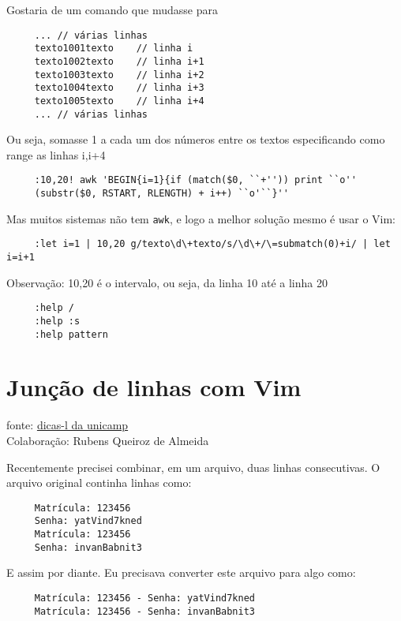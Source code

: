 Gostaria de um comando que mudasse para

\begin{verbatim}
     ... // várias linhas
     texto1001texto    // linha i
     texto1002texto    // linha i+1
     texto1003texto    // linha i+2
     texto1004texto    // linha i+3
     texto1005texto    // linha i+4
     ... // várias linhas
\end{verbatim}

Ou seja, somasse 1 a cada um dos números entre os textos
especificando como range as linhas i,i+4

\begin{verbatim}
     :10,20! awk 'BEGIN{i=1}{if (match($0, ``+'')) print ``o''
     (substr($0, RSTART, RLENGTH) + i++) ``o'``}''
\end{verbatim}

Mas muitos sistemas não tem {\tt awk}, e logo a melhor solução mesmo é usar o Vim:

\begin{verbatim}
     :let i=1 | 10,20 g/texto\d\+texto/s/\d\+/\=submatch(0)+i/ | let i=i+1
\end{verbatim}

Observação: 10,20 é o intervalo, ou seja, da linha 10 até a linha 20

\begin{verbatim}
     :help /
     :help :s
     :help pattern
\end{verbatim}



\section{Junção de linhas com Vim}
\label{sec:Junção de linhas com Vim}
fonte: \href{http://www.dicas-l.com.br/dicas-l/20081228.php}{dicas-l da unicamp} \\ 
Colaboração: Rubens Queiroz de Almeida

Recentemente precisei combinar, em um arquivo, duas linhas
consecutivas. O arquivo original continha linhas como:

\begin{verbatim}
     Matrícula: 123456
     Senha: yatVind7kned
     Matrícula: 123456
     Senha: invanBabnit3
\end{verbatim}

E assim por diante. Eu precisava converter este arquivo para algo como:

\begin{verbatim}
     Matrícula: 123456 - Senha: yatVind7kned
     Matrícula: 123456 - Senha: invanBabnit3
\end{verbatim}

